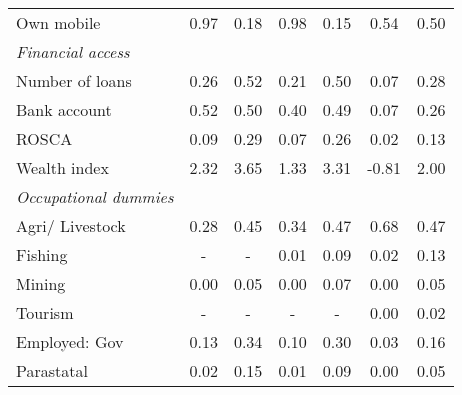 \begin{table}[htbp]
\begin{tabulary}{1 \textwidth}{Lcccccc}
    Own mobile &                     0.97  &                     0.18  &                     0.98  &                     0.15  &                      0.54  &                 0.50  \\
    \textit{Financial access } &       &       &       &       &       &  \\
    Number of loans &                     0.26  &                     0.52  &                     0.21  &                     0.50  &                      0.07  &                 0.28  \\
    Bank account &                     0.52  &                     0.50  &                     0.40  &                     0.49  &                      0.07  &                 0.26  \\
    ROSCA &                     0.09  &                     0.29  &                     0.07  &                     0.26  &                      0.02  &                 0.13  \\
    Wealth index & 2.32 & 3.65 & 1.33 & 3.31 & -0.81 & 2.00 \\
    \textit{Occupational dummies} &       &       &       &       &       &  \\
     Agri/ Livestock &                     0.28  &                     0.45  &                     0.34  &                     0.47  &                      0.68  &                 0.47  \\
     Fishing &                          -    &                          -    &                     0.01  &                     0.09  &                      0.02  &                 0.13  \\
     Mining &                     0.00  &                     0.05  &                     0.00  &                     0.07  &                      0.00  &                 0.05  \\
     Tourism &                          -    &                          -    &                          -    &                          -    &                      0.00  &                 0.02  \\
     Employed: Gov &                     0.13  &                     0.34  &                     0.10  &                     0.30  &                      0.03  &                 0.16  \\
     Parastatal &                     0.02  &                     0.15  &                     0.01  &                     0.09  &                      0.00  &                 0.05  \\

\end{tabulary}
\end{table}
